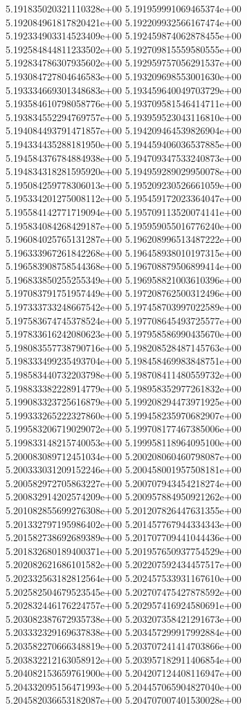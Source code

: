 5.191835020321110328e+00
5.191959991069465374e+00
5.192084961817820421e+00
5.192209932566167474e+00
5.192334903314523409e+00
5.192459874062878455e+00
5.192584844811233502e+00
5.192709815559580555e+00
5.192834786307935602e+00
5.192959757056291537e+00
5.193084727804646583e+00
5.193209698553001630e+00
5.193334669301348683e+00
5.193459640049703729e+00
5.193584610798058776e+00
5.193709581546414711e+00
5.193834552294769757e+00
5.193959523043116810e+00
5.194084493791471857e+00
5.194209464539826904e+00
5.194334435288181950e+00
5.194459406036537885e+00
5.194584376784884938e+00
5.194709347533240873e+00
5.194834318281595920e+00
5.194959289029950078e+00
5.195084259778306013e+00
5.195209230526661059e+00
5.195334201275008112e+00
5.195459172023364047e+00
5.195584142771719094e+00
5.195709113520074141e+00
5.195834084268429187e+00
5.195959055016776240e+00
5.196084025765131287e+00
5.196208996513487222e+00
5.196333967261842268e+00
5.196458938010197315e+00
5.196583908758544368e+00
5.196708879506899414e+00
5.196833850255255349e+00
5.196958821003610396e+00
5.197083791751957449e+00
5.197208762500312496e+00
5.197333733248667542e+00
5.197458703997022589e+00
5.197583674745378524e+00
5.197708645493725577e+00
5.197833616242080623e+00
5.197958586990435670e+00
5.198083557738790716e+00
5.198208528487145763e+00
5.198333499235493704e+00
5.198458469983848751e+00
5.198583440732203798e+00
5.198708411480559732e+00
5.198833382228914779e+00
5.198958352977261832e+00
5.199083323725616879e+00
5.199208294473971925e+00
5.199333265222327860e+00
5.199458235970682907e+00
5.199583206719029072e+00
5.199708177467385006e+00
5.199833148215740053e+00
5.199958118964095100e+00
5.200083089712451034e+00
5.200208060460798087e+00
5.200333031209152246e+00
5.200458001957508181e+00
5.200582972705863227e+00
5.200707943454218274e+00
5.200832914202574209e+00
5.200957884950921262e+00
5.201082855699276308e+00
5.201207826447631355e+00
5.201332797195986402e+00
5.201457767944334343e+00
5.201582738692689389e+00
5.201707709441044436e+00
5.201832680189400371e+00
5.201957650937754529e+00
5.202082621686101582e+00
5.202207592434457517e+00
5.202332563182812564e+00
5.202457533931167610e+00
5.202582504679523545e+00
5.202707475427878592e+00
5.202832446176224757e+00
5.202957416924580691e+00
5.203082387672935738e+00
5.203207358421291673e+00
5.203332329169637838e+00
5.203457299917992884e+00
5.203582270666348819e+00
5.203707241414703866e+00
5.203832212163058912e+00
5.203957182911406854e+00
5.204082153659761900e+00
5.204207124408116947e+00
5.204332095156471993e+00
5.204457065904827040e+00
5.204582036653182087e+00
5.204707007401530028e+00
